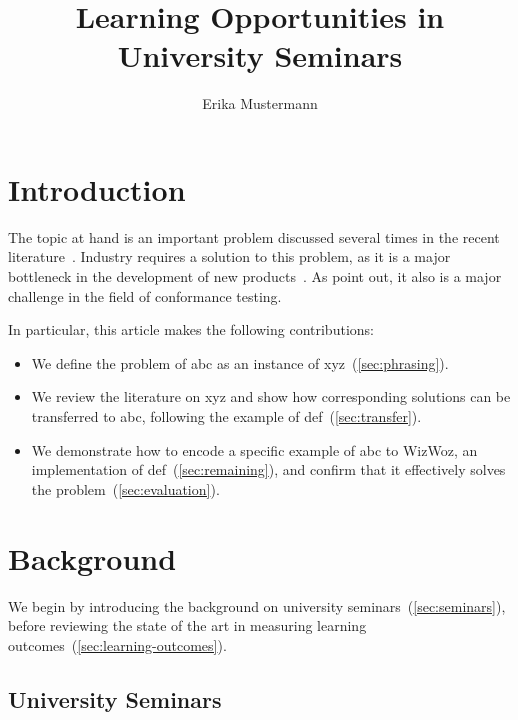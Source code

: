 \documentclass[seminar]{plai}
\title{Learning Opportunities in University Seminars}
\author{Erika Mustermann}
\begin{document}
\maketitle

\begin{abstract}
    \lipsum[1]
\end{abstract}


\section{Introduction}
\label{sec:introduction}

The topic at hand is an important problem discussed several times in the recent literature~\cite{oakland23-xfl,spmag23-mlmalware,cryptosec11}. Industry requires a solution to this problem, as it is a major bottleneck in the development of new products~\cite{statemerging-patent}. As \citet{conformance-testing-arxiv} point out, it also is a major challenge in the field of conformance testing. 
\lipsum[3-8]

In particular, this article makes the following contributions:
\begin{itemize}
    \item We define the problem of abc as an instance of xyz~(\autoref{sec:phrasing}).
    \item We review the literature on xyz and show how corresponding solutions can be transferred to abc, following the example of def~(\autoref{sec:transfer}).
    \item We demonstrate how to encode a specific example of abc to WizWoz, an implementation of def~(\autoref{sec:remaining}), and confirm that it effectively solves the problem~(\autoref{sec:evaluation}).
\end{itemize}

\section{Background}
\label{sec:background}

We begin by introducing the background on university seminars~(\autoref{sec:seminars}), before reviewing the state of the art in measuring learning outcomes~(\autoref{sec:learning-outcomes}).

\subsection{University Seminars}
\label{sec:seminars}
\end{document}
